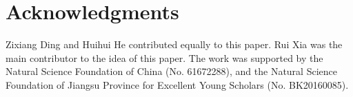 \documentclass[letterpaper]{article} \usepackage{aaai19}  \usepackage{times}  \usepackage{helvet}  \usepackage{courier}  \usepackage{url}  \usepackage{graphicx}  \frenchspacing  \setlength{\pdfpagewidth}{8.5in}  \setlength{\pdfpageheight}{11in}  \setcounter{secnumdepth}{0}
\begin{document}
\section{Acknowledgments}
\noindent Zixiang Ding and Huihui He contributed equally to this paper. Rui Xia was the main contributor to the idea of this paper. The work was supported by the Natural Science Foundation of China (No. 61672288), and the Natural Science Foundation of Jiangsu Province for Excellent Young Scholars (No. BK20160085).




\end{document}
